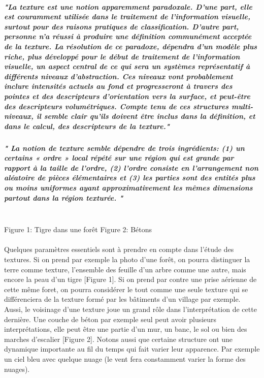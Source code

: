 \documentclass[12pt]{article}
\begin{document}
\subparagraph{
"La texture est une notion apparemment paradoxale. D'une part, elle est couramment utilisée dans le traitement de l'information visuelle, surtout pour des raisons pratiques de classification. D'autre part, personne n'a réussi à produire une définition communément acceptée de la texture. La résolution de ce paradoxe, dépendra d'un modèle plus riche, plus développé pour le début de traitement de l'information visuelle, un aspect central de ce qui sera un systèmes représentatif à différents niveaux d'abstraction. Ces niveaux vont probablement inclure intensités actuels au fond et progresseront à travers des pointes et des descripteurs d’orientation vers la surface, et peut-être des descripteurs volumétriques. Compte tenu de ces structures multi-niveaux, il semble clair qu'ils doivent être inclus dans la définition, et dans le calcul, des  descripteurs de la texture."
}

\subparagraph{
" La notion de texture semble dépendre de trois ingrédients: (1) un certains « ordre » local répété sur une région qui est grande par rapport à la taille de l'ordre, (2) l'ordre consiste en l'arrangement non aléatoire de pièces élémentaires et (3) les parties sont des entités plus ou moins uniformes ayant approximativement les mêmes dimensions partout dans la région texturée. "\\\\
}


Figure 1: Tigre dans une forêt				         Figure 2: Bétons

\paragraph{}
Quelques paramètres essentiels sont à prendre en compte dans l’étude des textures. Si on prend par exemple la photo d’une forêt, on pourra distinguer la terre comme texture,  l’ensemble des feuille d’un arbre comme une autre, mais encore la peau d’un tigre [Figure 1].
Si on prend par contre une prise aérienne de cette même foret, on pourra considérer le tout comme une seule texture qui se différenciera de la texture formé par les bâtiments d’un village par exemple. 
Aussi, le voisinage d’une texture joue un grand rôle dans l’interprétation de cette dernière. Une couche de béton par exemple seul peut avoir plusieurs interprétations, elle peut être une partie d’un mur,  un banc, le sol ou  bien des marches d’escalier [Figure 2].
Notons aussi que certaine structure ont une dynamique importante au fil du temps qui fait varier leur apparence. Par exemple un ciel bleu avec quelque nuage (le vent fera constamment varier la forme des nuages). 
\end{document}
